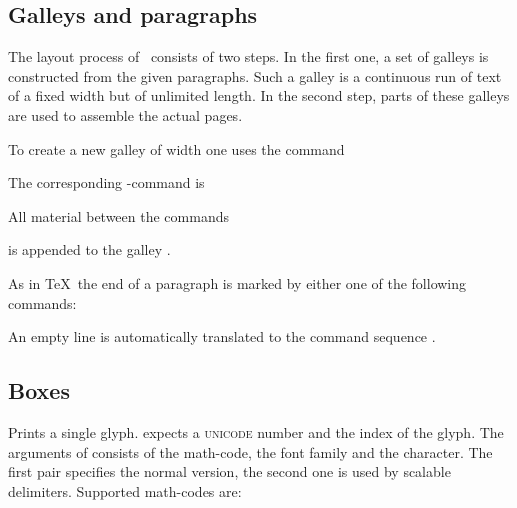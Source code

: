 \subsection{Galleys and paragraphs}   %


The layout process of \ant\ consists of two steps. In the first one, a set of galleys is constructed
from the given paragraphs. Such a galley is a continuous run of text of a fixed width but of unlimited
length. In the second step, parts of these galleys are used to assemble the actual pages.

To create a new galley of width  one uses the command
\begin{code}
  \cs{\newgalley}  
\end{code}
The corresponding \AL-command is
\begin{code}
    
\end{code}

All material between the commands
\begin{code}
  \cs{\begingalley} 

  \cs{\endgalley}
\end{code}
is appended to the galley .

As in \TeX\ the end of a paragraph is marked by either one of the following commands\?:
\begin{code}
 \cs{\endgraf}

 \cs{\par}
\end{code}
An empty line is automatically translated to the command sequence \cs{\par}.


\subsection{Boxes}   %


\begin{code}
  \cs{\char} 

  \cs{\glyph} 

  \cs{\mathchar}     
\end{code}
Prints a single glyph. \cs{\char} expects a \textsc{unicode} number and \cs{\glyph} the index of the glyph.
The arguments of \cs{\mathchar} consists of the math-code, the font family and the character. The first
pair specifies the normal version, the second one is used by scalable delimiters. Supported math-codes
are\?:

